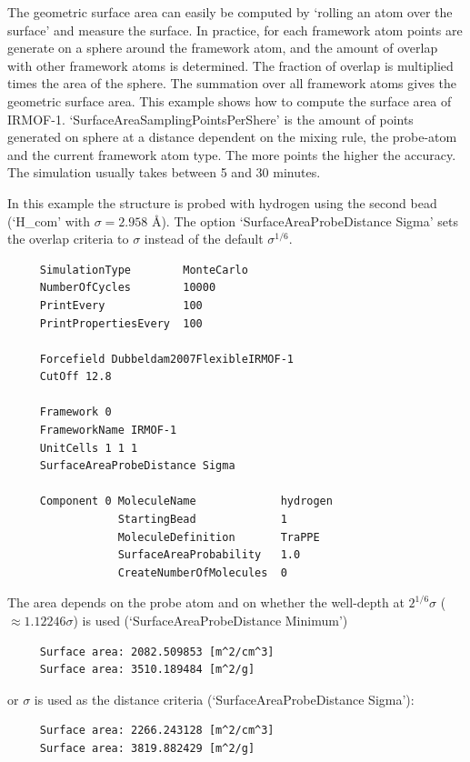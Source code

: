 The geometric surface area can easily be computed by `rolling an atom over the surface' and measure the surface. In practice,
for each framework atom points are generate on a sphere around the framework atom, and the amount of overlap with other framework
atoms is determined. The fraction of overlap is multiplied times the area of the sphere. The summation over all framework atoms
gives the geometric surface area. This example shows how to compute the surface area of IRMOF-1. `SurfaceAreaSamplingPointsPerShere'
is the amount of points generated on sphere at a distance dependent on the mixing rule, the probe-atom and the current framework atom type.
The more points the higher the accuracy. The simulation usually takes between 5 and 30 minutes.

In this example the structure is probed with hydrogen using the second bead (`H\_com' with $\sigma=2.958$ \AA). The option
`SurfaceAreaProbeDistance Sigma' sets the overlap criteria to $\sigma$ instead of the default $\sigma^{1/6}$.

\begin{tiny}
\begin{verbatim}
     SimulationType        MonteCarlo
     NumberOfCycles        10000
     PrintEvery            100
     PrintPropertiesEvery  100
     
     Forcefield Dubbeldam2007FlexibleIRMOF-1
     CutOff 12.8
     
     Framework 0
     FrameworkName IRMOF-1
     UnitCells 1 1 1
     SurfaceAreaProbeDistance Sigma
     
     Component 0 MoleculeName             hydrogen
                 StartingBead             1
                 MoleculeDefinition       TraPPE
                 SurfaceAreaProbability   1.0
                 CreateNumberOfMolecules  0
\end{verbatim}
\end{tiny}
The area depends on the probe atom and on whether the well-depth at $2^{1/6}\sigma$ ($\approx 1.12246\sigma$)
is used (`SurfaceAreaProbeDistance Minimum')
\begin{tiny}
\begin{verbatim}
     Surface area: 2082.509853 [m^2/cm^3]
     Surface area: 3510.189484 [m^2/g]
\end{verbatim}
\end{tiny}
or $\sigma$ is used as the distance criteria (`SurfaceAreaProbeDistance Sigma'):
\begin{tiny}
\begin{verbatim}
     Surface area: 2266.243128 [m^2/cm^3]
     Surface area: 3819.882429 [m^2/g]
\end{verbatim}
\end{tiny}



